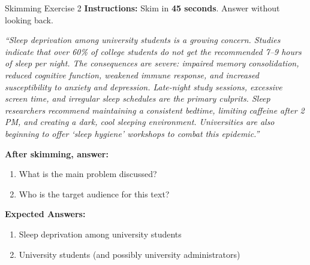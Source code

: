 \documentclass[12pt,a4paper]{article}
\begin{document}
\begin{practicebox}{Skimming Exercise 2}
\textbf{Instructions:} Skim in \textbf{45 seconds}. Answer without looking back.

\textit{``Sleep deprivation among university students is a growing concern. Studies indicate that over 60\% of college students do not get the recommended 7--9 hours of sleep per night. The consequences are severe: impaired memory consolidation, reduced cognitive function, weakened immune response, and increased susceptibility to anxiety and depression. Late-night study sessions, excessive screen time, and irregular sleep schedules are the primary culprits. Sleep researchers recommend maintaining a consistent bedtime, limiting caffeine after 2 PM, and creating a dark, cool sleeping environment. Universities are also beginning to offer `sleep hygiene' workshops to combat this epidemic.''}

\textbf{After skimming, answer:}
\begin{enumerate}[noitemsep]
    \item What is the main problem discussed?
    \item Who is the target audience for this text?
\end{enumerate}
\textbf{Expected Answers:}
\begin{enumerate}[noitemsep]
    \item Sleep deprivation among university students
    \item University students (and possibly university administrators)
\end{enumerate}
\end{practicebox}
\end{document}
